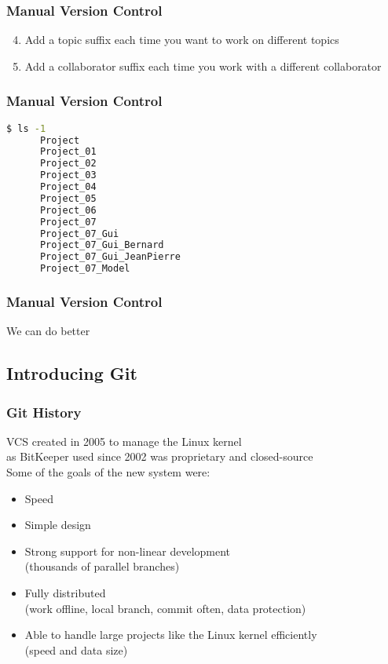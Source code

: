\begin{frame}\frametitle{Manual Version Control}
   \begin{enumerate}\setcounter{enumi}{3}
      \item Add a topic suffix each time you want to work on different topics
      \item Add a collaborator suffix each time you work with a different collaborator
   \end{enumerate}
\end{frame}

\begin{frame}[fragile]\frametitle{Manual Version Control}
   \begin{lstlisting}[language=bash, style=bash, autogobble]
      $ ls -1
      Project
      Project_01
      Project_02
      Project_03
      Project_04
      Project_05
      Project_06
      Project_07
      Project_07_Gui
      Project_07_Gui_Bernard
      Project_07_Gui_JeanPierre
      Project_07_Model
   \end{lstlisting}
\end{frame}

\begin{frame}\frametitle{Manual Version Control}
   \centering
   \Huge
   We can do better
\end{frame}

\subsection{Introducing Git}

\begin{frame}\frametitle{Git History}
   VCS created in 2005 to manage the Linux kernel \\
   as BitKeeper used since 2002 was proprietary and closed-source \\[2ex]

   Some of the goals of the new system were:
   \begin{itemize}
      \item Speed
      \item Simple design
      \item Strong support for non-linear development \\ (thousands of parallel branches)
      \item Fully distributed \\ (work offline, local branch, commit often, data protection)
      \item Able to handle large projects like the Linux kernel efficiently \\ (speed and data size)
   \end{itemize}
\end{frame}

